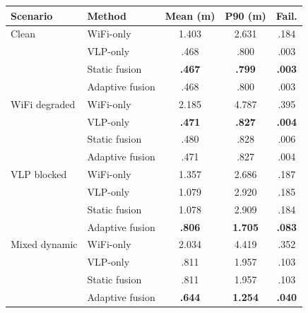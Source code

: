 \begin{tabular}{@{}llccc@{}}
\toprule
Scenario & Method & Mean (m) & P90 (m) & Fail. \\
\midrule
Clean & WiFi-only & 1.403 & 2.631 & .184 \\
 & VLP-only & .468 & .800 & .003 \\
 & Static fusion & \textbf{.467} & \textbf{.799} & \textbf{.003} \\
 & Adaptive fusion & .468 & .800 & .003 \\
\midrule
WiFi degraded & WiFi-only & 2.185 & 4.787 & .395 \\
 & VLP-only & \textbf{.471} & \textbf{.827} & \textbf{.004} \\
 & Static fusion & .480 & .828 & .006 \\
 & Adaptive fusion & .471 & .827 & .004 \\
\midrule
VLP blocked & WiFi-only & 1.357 & 2.686 & .187 \\
 & VLP-only & 1.079 & 2.920 & .185 \\
 & Static fusion & 1.078 & 2.909 & .184 \\
 & Adaptive fusion & \textbf{.806} & \textbf{1.705} & \textbf{.083} \\
\midrule
Mixed dynamic & WiFi-only & 2.034 & 4.419 & .352 \\
 & VLP-only & .811 & 1.957 & .103 \\
 & Static fusion & .811 & 1.957 & .103 \\
 & Adaptive fusion & \textbf{.644} & \textbf{1.254} & \textbf{.040} \\
\bottomrule
\end{tabular}
